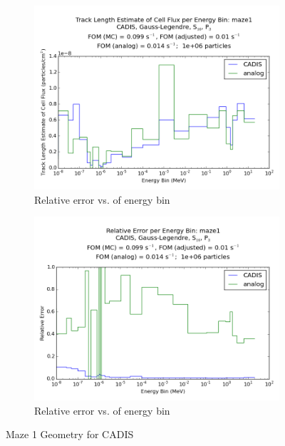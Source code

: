 \documentclass[10pt]{article}
\begin{document}
\begin{figure}[!ht]
\centering
\begin{subfigure}{0.49\textwidth}
\centering
\includegraphics[width = \textwidth]{tally-maze1-GL16.png}
\caption{Relative error vs. of energy bin}
\label{maze1-cad}
\end{subfigure}
\hfill
\begin{subfigure}{0.49\textwidth}
\centering
\includegraphics[width = \textwidth]{sigma-maze1-GL16.png}
\caption{Relative error vs. of energy bin}
\label{maze1-fwc}
\end{subfigure}
\caption{Maze 1 Geometry for CADIS}
\label{maze1}
\end{figure}
\end{document}
